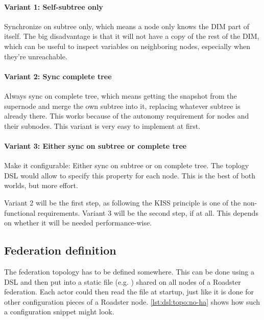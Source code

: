 \paragraph{Variant 1: Self-subtree only}
Synchronize on subtree only, which means a node only knows the DIM part of
itself. The big disadvantage is that it will not have a copy of the rest of the
DIM, which can be useful to inspect variables on neighboring nodes, especially
when they're unreachable.


\paragraph{Variant 2: Sync complete tree}\label{par:approach:dim:var2}
Always sync on complete tree, which means getting the snapshot from the
supernode and merge the own subtree into it, replacing whatever subtree is
already there. This works because of the autonomy requirement for nodes and
their subnodes. This variant is very easy to implement at first.

\paragraph{Variant 3: Either sync on subtree or complete tree}
Make it configurable: Either sync on subtree or on complete tree. The
toplogy DSL would allow to specify this property for each node. This is
the best of both worlds, but more effort.

Variant 2 will be the first step, as following the \gls{KISS} principle is one
of the non-functional requirements. Variant 3 will be the second step, if at
all. This depends on whether it will be needed performance-wise.

\subsection{Federation definition}
The federation topology has to be defined somewhere. This can be done using a
\gls{DSL} and then put into a static file (e.g. ) shared
on all nodes of a Roadster federation. Each actor could then read the file at
startup, just like it is done for other configuration pieces of a Roadster node.
\autoref{lst:dsl:topo:no-ha} shows how such a configuration snippet might look.

